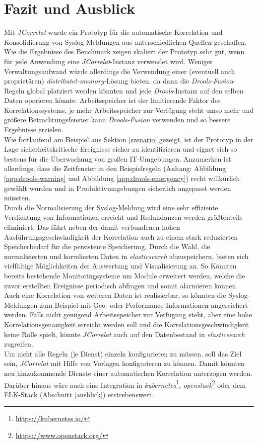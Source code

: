 \chapter{Fazit und Ausblick}
\thispagestyle{fancy}

Mit \textit{JCorrelat} wurde ein Prototyp für die automatische Korrelation und 
Konsolidierung von Syslog-Meldungen aus unterschiedlichen Quellen geschaffen. Wie die 
Ergebnisse des Benchmark zeigen skaliert der Prototyp sehr gut, wenn für jede Anwendung 
eine \textit{JCorrelat}-Instanz verwendet wird. Weniger Verwaltungsaufwand würde 
allerdings die Verwendung einer (eventuell auch proprietären) 
\textit{distributet-memory}-Lösung bieten, da dann die \textit{Drools-Fusion}-Regeln 
global platziert werden könnten und jede \textit{Drools}-Instanz auf den selben Daten 
operieren könnte. Arbeitsspeicher ist der limitierende Faktor des Korrelationssystems, je 
mehr Arbeitsspeicher zur Verfügung steht umso mehr und größere Betrachtungsfenster kann 
\textit{Drools-Fusion} verwenden und so bessere Ergebnisse erzielen.\\
Wie fortlaufend am Beispiel aus Sektion \ref{szenario} gezeigt, ist der Prototyp in der 
Lage sicherheitskritische Ereignisse sicher zu identifizieren und eignet sich so bestens 
für die Überwachung von großen IT-Umgebungen. Anzumerken ist allerdings, dass die 
Zeitfenster in den Beispielregeln (Anhang: Abbildung \ref{app:drools-warning} und 
Abbildung \ref{app:drools-emergency}) recht willkürlich gewählt wurden und in 
Produktivumgebungen sicherlich angepasst werden müssten.\\

Durch die Normalisierung der Syslog-Meldung wird eine sehr effiziente Verdichtung von 
Informationen erreicht und Redundanzen werden größtenteils eliminiert. Das führt neben 
der damit verbundenen hohen Ausführungsgeschwindigkeit der Korrelation auch zu einem 
stark reduzierten Speicherbedarf für die persistente Speicherung. Durch die Wahl, die 
normalisierten und korrelierten Daten in \textit{elasticsearch} abzuspeichern, bieten 
sich vielfältige Möglichkeiten der Auswertung und Visualisierung an. So Könnten bereits 
bestehende Monitoringsysteme um Module erweitert werden, welche die zuvor erstellten 
Ereignisse periodisch abfragen und somit alarmieren können.\\

Auch eine Korrelation von weiteren Daten ist realisierbar, so könnten die 
Syslog-Meldungen zum Beispiel mit Geo- oder Performance-Informationen angereichert 
werden. Falls nicht genügend Arbeitsspeicher zur Verfügung steht, aber eine hohe 
Korrelationsgenauigkeit erreicht werden soll und die Korrelationsgeschwindigkeit keine 
Rolle spielt, könnte \textit{JCorrelat} auch auf den Datenbestand in 
\textit{elasticsearch} zugreifen.\\
Um nicht alle Regeln (je Dienst) einzeln konfigurieren zu müssen, soll das Ziel sein, 
\textit{JCorrelat} mit Hilfe von Vorlagen konfigurieren zu können. Damit könnten neu 
hinzukommende Dienste einer automatischen Korrelation unterzogen werden. Darüber hinaus 
wäre auch eine Integration in \textit{kubernetes}\footnote{\url{https://kubernetes.io/}}, 
\textit{openstack}\footnote{\url{https://www.openstack.org/}} oder dem ELK-Stack 
(Abschnitt \ref{ausblick}) erstrebenswert. 